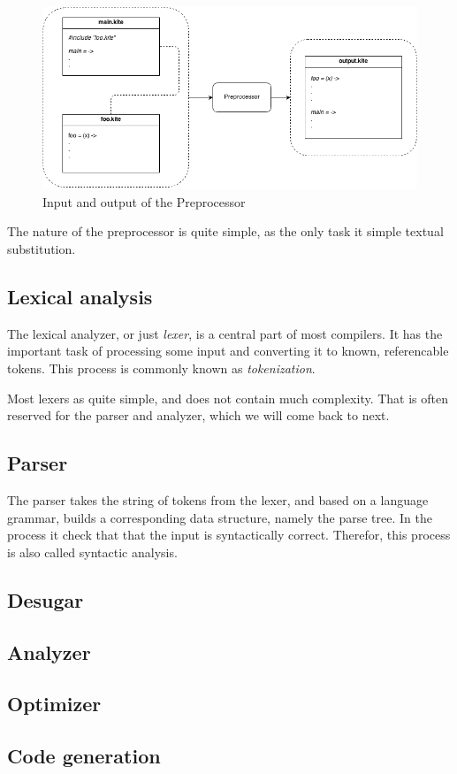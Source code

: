 \begin{figure}[H]
  \label{fig:preprocessor}
  \center
  \includegraphics[scale=0.45]{images/preprocessor.png}
  \caption{Input and output of the Preprocessor}
\end{figure}

The nature of the preprocessor is quite simple, as the only task it
simple textual substitution.

\subsection{Lexical analysis}
The lexical analyzer, or just \emph{lexer}, is a central part of most
compilers. It has the important task of processing some input and
converting it to known, referencable tokens. This process is commonly
known as \emph{tokenization}.

Most lexers as quite simple, and does not contain much
complexity. That is often reserved for the parser and analyzer, which
we will come back to next.

\subsection{Parser}
The parser takes the string of tokens from the lexer, and based on a
language grammar, builds a corresponding data structure, namely the
parse tree. In the process it check that that the input is
syntactically correct. Therefor, this process is also called syntactic
analysis.

\subsection{Desugar}

\subsection{Analyzer}

\subsection{Optimizer}

\subsection{Code generation}
